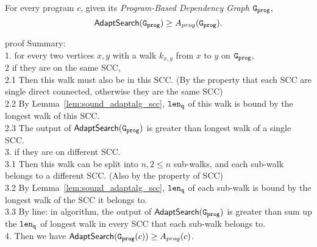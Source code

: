 \begin{thm}
  \label{thm:sound_adaptalg}
  For every program $c$, given its \emph{Program-Based Dependency Graph} $\mathtt{{G_{prog}}}$,
   $$\mathsf{AdaptSearch}(\mathtt{{G_{prog}}}) \geq A_{{prog}}(\mathtt{{G_{prog}}}).$$
\end{thm}
proof Summary:
\\
1. for every two vertices $x, y$ with a walk $k_{x,y}$ from $x$ to $y$ on $\mathtt{{G_{prog}}}$, 
\\
2 if they are on the same SCC, 
\\
2.1 Then this walk must also be in this SCC.
(By the property that each SCC are single direct connected, otherwise they are the same SCC)
\\
2.2 By Lemma~\ref{lem:sound_adaptalg_scc}, $\mathtt{len}_{\tt q}$ of this walk is bound by the longest walk of this SCC.
\\
2.3 The output of $\mathsf{AdaptSearch}(\mathtt{{G_{prog}}})$ is greater than longest walk of a single SCC.
\\
3. if they are on different SCC. 
\\
3.1 Then this walk can be split into $n, 2 \leq n$ sub-walks, and each sub-walk belongs to a different SCC. (Also by the property of SCC)
\\
3.2 By Lemma~\ref{lem:sound_adaptalg_scc}, $\mathtt{len}_{\tt q}$ of each sub-walk is bound by the longest walk of the SCC it belongs to.
\\
3.3 By line: in algorithm, the output of $\mathsf{AdaptSearch}(\mathtt{{G_{prog}}})$ is greater than sum up the $\mathtt{len}_{\tt q}$ of longest walk in every SCC that each sub-walk belongs to.
\\
4. Then we have
$\mathsf{AdaptSearch}(\mathtt{{G_{prog}}}(c)) \geq A_{{prog}}(c)$.
